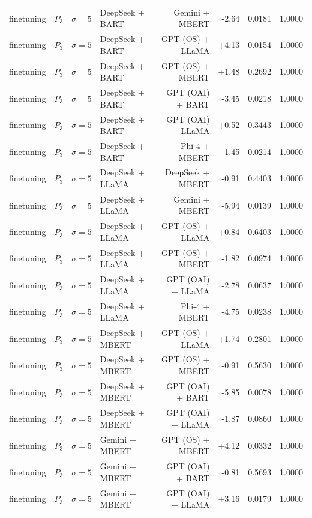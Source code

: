 \begin{table}[htbp]
\begin{tabular*}{\textwidth}{@{\extracolsep{\fill}}llllrrrl}
finetuning & $P_3$ & $\sigma{=}5$ & DeepSeek + BART & Gemini + MBERT & -2.64 & 0.0181 & 1.0000 \\
finetuning & $P_3$ & $\sigma{=}5$ & DeepSeek + BART & GPT (OS) + LLaMA & +4.13 & 0.0154 & 1.0000 \\
finetuning & $P_3$ & $\sigma{=}5$ & DeepSeek + BART & GPT (OS) + MBERT & +1.48 & 0.2692 & 1.0000 \\
finetuning & $P_3$ & $\sigma{=}5$ & DeepSeek + BART & GPT (OAI) + BART & -3.45 & 0.0218 & 1.0000 \\
finetuning & $P_3$ & $\sigma{=}5$ & DeepSeek + BART & GPT (OAI) + LLaMA & +0.52 & 0.3443 & 1.0000 \\
finetuning & $P_3$ & $\sigma{=}5$ & DeepSeek + BART & Phi-4 + MBERT & -1.45 & 0.0214 & 1.0000 \\
finetuning & $P_3$ & $\sigma{=}5$ & DeepSeek + LLaMA & DeepSeek + MBERT & -0.91 & 0.4403 & 1.0000 \\
finetuning & $P_3$ & $\sigma{=}5$ & DeepSeek + LLaMA & Gemini + MBERT & -5.94 & 0.0139 & 1.0000 \\
finetuning & $P_3$ & $\sigma{=}5$ & DeepSeek + LLaMA & GPT (OS) + LLaMA & +0.84 & 0.6403 & 1.0000 \\
finetuning & $P_3$ & $\sigma{=}5$ & DeepSeek + LLaMA & GPT (OS) + MBERT & -1.82 & 0.0974 & 1.0000 \\
finetuning & $P_3$ & $\sigma{=}5$ & DeepSeek + LLaMA & GPT (OAI) + LLaMA & -2.78 & 0.0637 & 1.0000 \\
finetuning & $P_3$ & $\sigma{=}5$ & DeepSeek + LLaMA & Phi-4 + MBERT & -4.75 & 0.0238 & 1.0000 \\
finetuning & $P_3$ & $\sigma{=}5$ & DeepSeek + MBERT & GPT (OS) + LLaMA & +1.74 & 0.2801 & 1.0000 \\
finetuning & $P_3$ & $\sigma{=}5$ & DeepSeek + MBERT & GPT (OS) + MBERT & -0.91 & 0.5630 & 1.0000 \\
finetuning & $P_3$ & $\sigma{=}5$ & DeepSeek + MBERT & GPT (OAI) + BART & -5.85 & 0.0078 & 1.0000 \\
finetuning & $P_3$ & $\sigma{=}5$ & DeepSeek + MBERT & GPT (OAI) + LLaMA & -1.87 & 0.0860 & 1.0000 \\
finetuning & $P_3$ & $\sigma{=}5$ & Gemini + MBERT & GPT (OS) + MBERT & +4.12 & 0.0332 & 1.0000 \\
finetuning & $P_3$ & $\sigma{=}5$ & Gemini + MBERT & GPT (OAI) + BART & -0.81 & 0.5693 & 1.0000 \\
finetuning & $P_3$ & $\sigma{=}5$ & Gemini + MBERT & GPT (OAI) + LLaMA & +3.16 & 0.0179 & 1.0000 \\

\end{tabular*}
\end{table}
